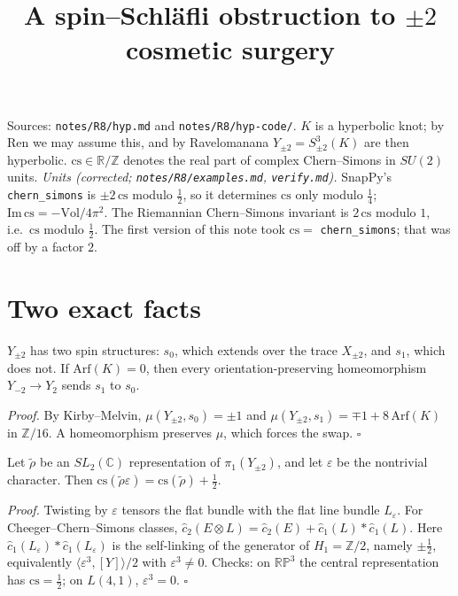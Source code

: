 \documentclass[10pt]{amsart}
\title{A spin--Schl\"afli obstruction to $\pm2$ cosmetic surgery}
\date{}
\begin{document}
\sloppy
\maketitle
\vspace{-2.5em}

\noindent Sources: \texttt{notes/R8/hyp.md} and \texttt{notes/R8/hyp-code/}. $K$ is a hyperbolic knot; by Ren we may
assume this, and by Ravelomanana $Y_{\pm2}=S^3_{\pm2}(K)$ are then hyperbolic.
$\mathrm{cs}\in\mathbb R/\mathbb Z$ denotes the real part of complex Chern--Simons in $SU(2)$ units.
\emph{Units (corrected; \texttt{notes/R8/examples.md}, \texttt{verify.md}).} SnapPy's \texttt{chern\_simons} is $\pm2\,\mathrm{cs}$
modulo $\tfrac12$, so it determines $\mathrm{cs}$ only modulo $\tfrac14$; $\mathrm{Im}\,\mathrm{cs}=-\mathrm{Vol}/4\pi^2$.
The Riemannian Chern--Simons invariant is $2\,\mathrm{cs}$ modulo $1$, i.e.\ $\mathrm{cs}$ modulo $\tfrac12$.
The first version of this note took $\mathrm{cs}=$ \texttt{chern\_simons}; that was off by a factor $2$.

\section{Two exact facts}

\begin{lem}
$Y_{\pm2}$ has two spin structures: $s_0$, which extends over the trace $X_{\pm2}$, and $s_1$, which does not.
If $\mathrm{Arf}(K)=0$, then every orientation-preserving homeomorphism $Y_{-2}\to Y_2$ sends $s_1$ to $s_0$.
\end{lem}
\noindent\emph{Proof.} By Kirby--Melvin, $\mu(Y_{\pm2},s_0)=\pm1$ and
$\mu(Y_{\pm2},s_1)=\mp1+8\,\mathrm{Arf}(K)$ in $\mathbb Z/16$. A homeomorphism preserves $\mu$, which forces the swap. $\square$

\begin{lem}
Let $\tilde\rho$ be an $SL_2(\mathbb C)$ representation of $\pi_1(Y_{\pm2})$, and let $\varepsilon$ be the
nontrivial character. Then $\mathrm{cs}(\tilde\rho\varepsilon)=\mathrm{cs}(\tilde\rho)+\tfrac12$.
\end{lem}
\noindent\emph{Proof.} Twisting by $\varepsilon$ tensors the flat bundle with the flat line bundle $L_\varepsilon$.
For Cheeger--Chern--Simons classes, $\hat c_2(E\otimes L)=\hat c_2(E)+\hat c_1(L)\ast\hat c_1(L)$.
Here $\hat c_1(L_\varepsilon)\ast\hat c_1(L_\varepsilon)$ is the self-linking of the generator of $H_1=\mathbb Z/2$,
namely $\pm\tfrac12$, equivalently $\langle\varepsilon^3,[Y]\rangle/2$ with $\varepsilon^3\neq0$.
Checks: on $\mathbb{RP}^3$ the central representation has $\mathrm{cs}=\tfrac12$; on $L(4,1)$, $\varepsilon^3=0$. $\square$
\end{document}
